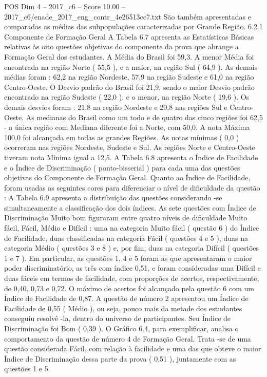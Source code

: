 \begin{textsample}{POS Dim 4 – 2017\_c6 – Score 10.00 – 2017\_c6/enade\_2017\_eng\_contr\_4e26513cc7.txt}
São também apresentadas e comparadas as médias das subpopulações caracterizadas por Grande Região. 6.2.1 Componente de Formação Geral A Tabela 6.7 apresenta as Estatísticas Básicas relativas às oito questões objetivas do componente da prova que abrange a Formação Geral dos estudantes.
A Média do Brasil foi 59,3.
A menor Média foi encontrada na região Norte ( 55,5 ), e a maior, na região Sul ( 64,9 ).
As demais médias foram : 62,2 na região Nordeste, 57,9 na região Sudeste e 61,0 na região Centro-Oeste.
O Desvio padrão do Brasil foi 21,9, sendo o maior Desvio padrão encontrado na região Sudeste ( 22,0 ), e o menor, na região Norte ( 19,6 ).
Os demais desvios foram : 21,8 na região Nordeste e 20,8 nas regiões Sul e Centro-Oeste.
As medianas do Brasil como um todo e de quatro das cinco regiões foi 62,5 - a única região com Mediana diferente foi a Norte, com 50,0.
A nota Máxima 100,0 foi alcançada em todas as grandes Regiões.
As notas mínimas ( 0,0 ) ocorreram nas regiões Nordeste, Sudeste e Sul.
As regiões Norte e Centro-Oeste tiveram nota Mínima igual a 12,5.
A Tabela 6.8 apresenta o Índice de Facilidade e o Índice de Discriminação ( ponto-bisserial ) para cada uma das questões objetivas do Componente de Formação Geral.
Quanto ao Índice de Facilidade, foram usadas as seguintes cores para diferenciar o nível de dificuldade da questão : A Tabela 6.9 apresenta a distribuição das questões considerando -se simultaneamente a classificação dos dois índices.
As sete questões com Índice de Discriminação Muito bom figuraram entre quatro níveis de dificuldade Muito fácil, Fácil, Médio e Difícil : uma na categoria Muito fácil ( questão 6 ) do Índice de Facilidade, duas classificadas na categoria Fácil ( questões 4 e 5 ), duas na categoria Médio ( questões 3 e 8 ) e, por fim, duas na categoria Difícil ( questões 1 e 7 ).
Em particular, as questões 1, 4 e 5 foram as que apresentaram o maior poder discriminatório, as três com índice 0,51, e foram consideradas uma Difícil e duas fáceis em termos de facilidade, com proporções de acertos, respectivamente, de 0,40, 0,73 e 0,72.
O máximo de acertos foi alcançado pela questão 6 com um Índice de Facilidade de 0,87.
A questão de número 2 apresentou um Índice de Facilidade de 0,55 ( Médio ), ou seja, pouco mais da metade dos estudantes conseguiu resolvê -la, dentro do universo de participantes.
Seu Índice de Discriminação foi Bom ( 0,39 ).
O Gráfico 6.4, para exemplificar, analisa o comportamento da questão de número 4 de Formação Geral.
Trata -se de uma questão considerada Fácil, com relação à facilidade e uma das que obteve o maior Índice de Discriminação dessa parte da prova ( 0,51 ), juntamente com as questões 1 e 5.

\end{textsample}
